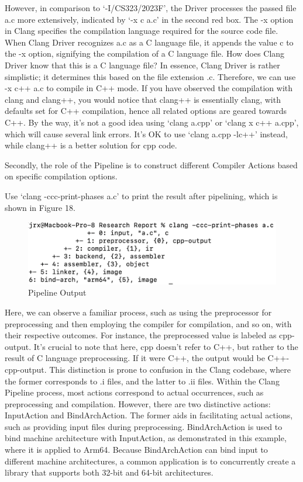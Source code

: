 \documentclass[conference]{IEEEtran}
\begin{document}
However, in comparison to `-I/CS323/2023F', the Driver processes the passed file a.c more extensively, indicated by `-x c a.c' in the second red box. The -x option in Clang specifies the compilation language required for the source code file. When Clang Driver recognizes a.c as a C language file, it appends the value c to the -x option, signifying the compilation of a C language file. How does Clang Driver know that this is a C language file? In essence, Clang Driver is rather simplistic; it determines this based on the file extension .c. Therefore, we can use -x c++ a.c to compile in C++ mode. If you have observed the compilation with clang and clang++, you would notice that clang++ is essentially clang, with defaults set for C++ compilation, hence all related options are geared towards C++. By the way, it's not a good idea using `clang a.cpp' or `clang x c++ a.cpp', which will cause several link errors. It's OK to use `clang a.cpp -lc++' instead, while clang++ is a better solution for cpp code.

Secondly, the role of the Pipeline is to construct different Compiler Actions based on specific compilation options.

Use `clang -ccc-print-phases a.c' to print the result after pipelining, which is shown in Figure 18.

\begin{figure}[htbp]
\centering
\includegraphics [width=0.9\linewidth]{pictures/Pipeline.png}
\caption{Pipeline Output}
\label{fig18}
\end{figure}

Here, we can observe a familiar process, such as using the preprocessor for preprocessing and then employing the compiler for compilation, and so on, with their respective outcomes. For instance, the preprocessed value is labeled as cpp-output. It's crucial to note that here, cpp doesn't refer to C++, but rather to the result of C language preprocessing. If it were C++, the output would be C++-cpp-output. This distinction is prone to confusion in the Clang codebase, where the former corresponds to .i files, and the latter to .ii files. Within the Clang Pipeline process, most actions correspond to actual occurrences, such as preprocessing and compilation. However, there are two distinctive actions: InputAction and BindArchAction. The former aids in facilitating actual actions, such as providing input files during preprocessing. BindArchAction is used to bind machine architecture with InputAction, as demonstrated in this example, where it is applied to Arm64. Because BindArchAction can bind input to different machine architectures, a common application is to concurrently create a library that supports both 32-bit and 64-bit architectures.
\end{document}
